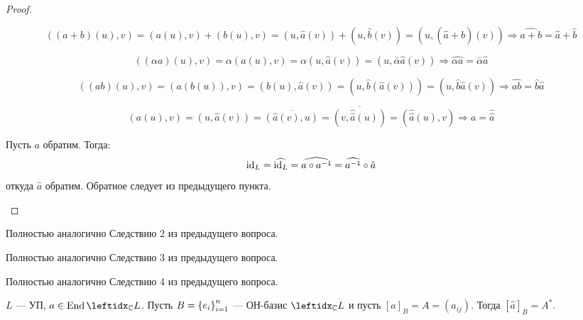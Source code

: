 \begin{proof}
    \begin{proofpart}
        $$((a + b)(u), v) = (a(u), v) + (b(u), v) = (u, \hat{a}(v)) + (u, \hat{b}(v)) = (u, (\hat{a} + \hat{b})(v)) \Rightarrow \widehat{a + b} = \hat{a} + \hat{b}$$
    \end{proofpart}

    \begin{proofpart}
        $$((\alpha a)(u), v) = \alpha(a(u), v) = \alpha(u, \hat{a}(v)) = (u, \bar{\alpha}\hat{a}(v)) \Rightarrow \widehat{\alpha a} = \bar{\alpha} \hat{a}$$
    \end{proofpart}

    \begin{proofpart}
        $$((ab)(u), v) = (a(b(u)), v) = (b(u), \hat{a}(v)) =(u, \hat{b}(\hat{a}(v))) = (u, \hat{b} \hat{a}(v)) \Rightarrow \widehat{ab} = \hat{b} \hat{a}$$
    \end{proofpart}

    \begin{proofpart}
        $$(a(u), v) = (u, \hat{a}(v)) = \overline{(\hat{a}(v), u)} = \overline{(v, \hat{\hat{a}}(u))} = (\hat{\hat{a}}(u), v) \Rightarrow a = \hat{\hat{a}}$$
    \end{proofpart}

    \begin{proofpart}
        Пусть $a$ обратим. Тогда:
        $$\operatorname{id}_L = \widehat{\operatorname{id}_L} = \widehat{a \circ a^{-1}} = \widehat{a^{-1}} \circ \hat{a}$$
        откуда $\hat{a}$ обратим. Обратное следует из предыдущего пункта.
    \end{proofpart}
\end{proof}

\begin{cor}
    Полностью аналогично Следствию 2 из предыдущего вопроса.
\end{cor}

\begin{cor}
    Полностью аналогично Следствию 3 из предыдущего вопроса.
\end{cor}

\begin{cor}
    Полностью аналогично Следствию 4 из предыдущего вопроса.
\end{cor}

\begin{thm}
    $L$ --- УП, $a \in \End \lsub{\mathbb{C}}{L}$. Пусть $B = \left\{e_i\right\}_{i=1}^{n}$ --- ОН-базис $\lsub{\mathbb{C}}{L}$ и пусть $[a]_B = A = (a_{ij})$. Тогда $[\hat{a}]_B = A^*$.
\end{thm}

